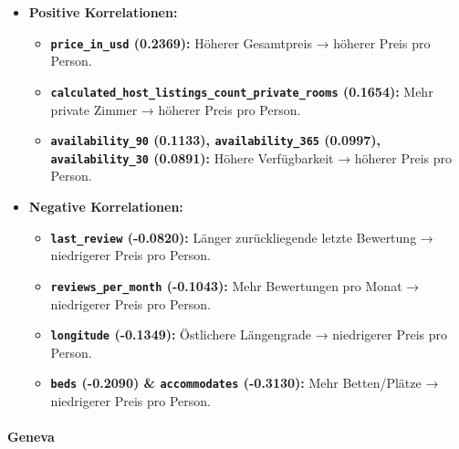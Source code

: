 \documentclass[
  journal,
]{IEEEtran}%
\let\oldparagraph\paragraph
\renewcommand{\paragraph}[1]{\oldparagraph{#1}\mbox{}}
\providecommand{\tightlist}{%
  \setlength{\itemsep}{0pt}\setlength{\parskip}{0pt}}\usepackage{longtable,booktabs,array}
\begin{document}
\begin{itemize}
\item
  \textbf{Positive Korrelationen:}

  \begin{itemize}
  \tightlist
  \item
    \textbf{\texttt{price\_in\_usd} (0.2369):} Höherer Gesamtpreis →
    höherer Preis pro Person.
  \item
    \textbf{\texttt{calculated\_host\_listings\_count\_private\_rooms}
    (0.1654):} Mehr private Zimmer → höherer Preis pro Person.
  \item
    \textbf{\texttt{availability\_90} (0.1133),
    \texttt{availability\_365} (0.0997), \texttt{availability\_30}
    (0.0891):} Höhere Verfügbarkeit → höherer Preis pro Person.
  \end{itemize}
\item
  \textbf{Negative Korrelationen:}

  \begin{itemize}
  \tightlist
  \item
    \textbf{\texttt{last\_review} (-0.0820):} Länger zurückliegende
    letzte Bewertung → niedrigerer Preis pro Person.
  \item
    \textbf{\texttt{reviews\_per\_month} (-0.1043):} Mehr Bewertungen
    pro Monat → niedrigerer Preis pro Person.
  \item
    \textbf{\texttt{longitude} (-0.1349):} Östlichere Längengrade →
    niedrigerer Preis pro Person.
  \item
    \textbf{\texttt{beds} (-0.2090) \& \texttt{accommodates} (-0.3130):}
    Mehr Betten/Plätze → niedrigerer Preis pro Person.
  \end{itemize}
\end{itemize}

\hypertarget{geneva}{%
\paragraph{Geneva}\label{geneva}}
\end{document}
